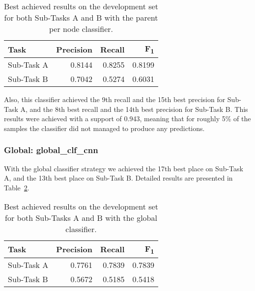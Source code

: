 \documentclass[11pt,a4paper]{article}
\begin{document}
\begin{table}[!h]
\begin{center}
\begin{tabular}{|l|r|r|r|}
\hline\centering\textbf{Task}  & \textbf{Precision} &  \textbf{Recall} &  \textbf{F\textsubscript{1}}\\
\hline
 Sub-Task A   &  0.8144 & 0.8255 & 0.8199 \\
 Sub-Task B   &  0.7042 & 0.5274 & 0.6031 \\
\hline
\end{tabular}
\end{center}
\caption{\label{local_devset-results} Best achieved results on the development
          set for both Sub-Tasks A and B with the parent per node classifier.}
\end{table}

Also, this classifier achieved the 9th recall and the 15th best precision
for Sub-Task A, and the 8th best recall and the 14th best precision for Sub-Task B.
This results were achieved with a support of 0.943, meaning that for
roughly 5\% of the samples the classifier did not managed to produce any
predictions.




\subsubsection{Global: global\_clf\_cnn}

With the global classifier strategy we achieved the 17th best place on Sub-Task A,
and the 13th best place on Sub-Task B. Detailed results are presented in
Table~\ref{global_devset-results}.

\begin{table}[!h]
\begin{center}
\begin{tabular}{|l|r|r|r|}
\hline\centering\textbf{Task}  & \textbf{Precision} &  \textbf{Recall} &  \textbf{F\textsubscript{1}}\\
\hline
 Sub-Task A   &  0.7761 & 0.7839 & 0.7839 \\
 Sub-Task B   &  0.5672 & 0.5185 & 0.5418 \\
\hline
\end{tabular}
\end{center}
\caption{\label{global_devset-results} Best achieved results on the development
          set for both Sub-Tasks A and B with the global classifier.}
\end{table}
\end{document}
